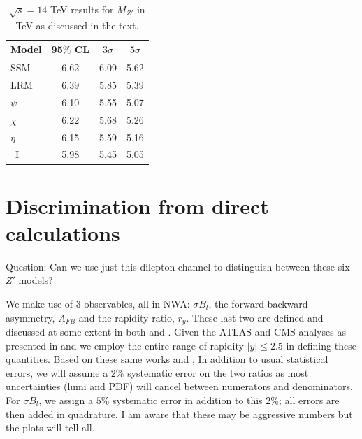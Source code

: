 \documentclass[14pt]{article}
\begin{document}
%
\begin{table}
\centering
\begin{tabular}{|l|c|c|c|} \hline\hline
  Model &   95$\%$ CL     &  $3\sigma$     &   $5\sigma$   \\
\hline
SSM    &     6.62     &  6.09        &  5.62     \\
LRM    &   6.39     & 5.85        & 5.39  \\
$\psi$    &  6.10   & 5.55   & 5.07  \\
$\chi$   &  6.22    & 5.68    & 5.26   \\
$\eta$   &  6.15     &  5.59  &  5.16   \\
~I        & 5.98   &  5.45   &  5.05  \\
\hline\hline
\end{tabular}
\caption{ $\sqrt s=14$ TeV results for $M_{Z'}$ in TeV as discussed in the text. }
\label{spec}
\end{table}
%


\section{Discrimination from direct calculations}
Question: Can we use just this dilepton channel to distinguish between these six $Z'$ models?  

We make use of 3 observables, all in NWA: $\sigma B_l$, the forward-backward asymmetry, $A_{FB}$ and the rapidity ratio, $r_y$. These last two are defined 
and discussed at some extent in both \cite{Rizzo:2014xma} and \cite{Han:2013mra}.  Given the ATLAS and CMS analyses as presented in \cite{Han:2016qpd} 
and \cite{CMS:2017zzj} we employ the entire range of rapidity $|y|\leq 2.5$ in defining these quantities. Based on these same works and \cite{Han:2013mra}, 
In addition to usual statistical errors, we will assume a $2\%$ systematic error on the two ratios as most uncertainties (lumi and PDF) will cancel between numerators 
and denominators. For $\sigma B_l$, we assign a $5\%$ systematic error in addition to this $2\%$; all errors are then added in quadrature. I am aware that these may 
be aggressive numbers but the plots will tell all. 
\end{document}
